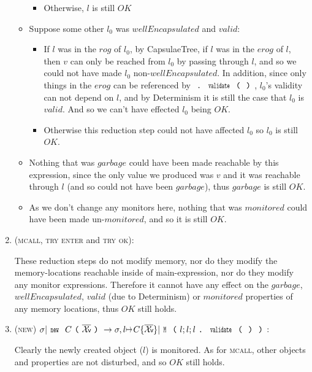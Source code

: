 \begin{enumerate}
\begin{itemize}
\begin{itemize}
		    \item Otherwise, $l$ is still $OK$
    	\end{itemize}

	\item Suppose some other $l_0$ was $wellEncapsulated$ and $valid$:
	\begin{itemize}
			\item If $l$ was in the $rog$ of $l_0$, by CapsulaeTree, if $l$ was in the $erog$ of $l$, then $v$ can only be reached from $l_0$ by passing through $l$, and so we could not have made $l_0$ non-$wellEncapsulated$. In addition, since only things in the $erog$ can be referenced by $\singleDot\Kw{validate}\oR\cR$, $l_0$’s validity can not depend on $l$, and by Determinism it is still the case that $l_0$ is $valid$. And so we can’t have effected $l_0$ being $OK$.
			\item Otherwise this reduction step could not have affected $l_0$ so $l_0$ is still $OK$.
	\end{itemize}


	\item Nothing that was $\mathit{garbage}$ could have been made reachable by this expression, since the only value we produced was $v$ and it was reachable through $l$ (and so could not have been $garbage$), thus $garbage$ is still $OK$.

	\item As we don’t change any monitors here, nothing that was $monitored$ could have been made un-$monitored$, and so it is still $OK$.
\end{itemize}

\item (\textsc{mcall}, \textsc{try enter} and \textsc{try ok}):

	These reduction steps do not modify memory, nor do they modify the memory-locations reachable inside of main-expression, nor do they modify any monitor expressions. Therefore it cannot have any effect on the $garbage$, $wellEncapsulated$, $valid$ (due to Determinism) or $monitored$ properties of any memory locations, thus $\mathit{OK}$ still holds.

\item (\textsc{new}) $\sigma|\Kw{new}\ C\oR\vs\cR\rightarrow \sigma,l\mapsto C\{\vs\}| \Kw{M}\oR l;l;l\singleDot\Kw{validate}\oR\cR\cR$:

	Clearly the newly created object ($l$) is monitored. As for \textsc{mcall}, other objects and properties are not disturbed, and so $\mathit{OK}$ still holds.



\end{enumerate}
